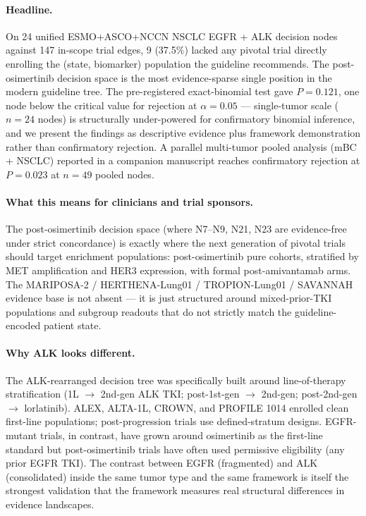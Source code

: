 \documentclass[11pt,a4paper]{article}
\begin{document}
\paragraph{Headline.}
On 24 unified ESMO+ASCO+NCCN NSCLC EGFR + ALK decision nodes against 147 in-scope trial edges, 9 (37.5\%) lacked any pivotal trial directly enrolling the (state, biomarker) population the guideline recommends. The post-osimertinib decision space is the most evidence-sparse single position in the modern guideline tree. The pre-registered exact-binomial test gave $P = 0.121$, one node below the critical value for rejection at $\alpha = 0.05$ — single-tumor scale ($n = 24$ nodes) is structurally under-powered for confirmatory binomial inference, and we present the findings as descriptive evidence plus framework demonstration rather than confirmatory rejection. A parallel multi-tumor pooled analysis (mBC + NSCLC) reported in a companion manuscript reaches confirmatory rejection at $P = 0.023$ at $n = 49$ pooled nodes.

\paragraph{What this means for clinicians and trial sponsors.}
The post-osimertinib decision space (where N7--N9, N21, N23 are evidence-free under strict concordance) is exactly where the next generation of pivotal trials should target enrichment populations: post-osimertinib pure cohorts, stratified by MET amplification and HER3 expression, with formal post-amivantamab arms. The MARIPOSA-2 / HERTHENA-Lung01 / TROPION-Lung01 / SAVANNAH evidence base is not absent --- it is just structured around mixed-prior-TKI populations and subgroup readouts that do not strictly match the guideline-encoded patient state.

\paragraph{Why ALK looks different.}
The ALK-rearranged decision tree was specifically built around line-of-therapy stratification (1L $\to$ 2nd-gen ALK TKI; post-1st-gen $\to$ 2nd-gen; post-2nd-gen $\to$ lorlatinib). ALEX, ALTA-1L, CROWN, and PROFILE 1014 enrolled clean first-line populations; post-progression trials use defined-stratum designs. EGFR-mutant trials, in contrast, have grown around osimertinib as the first-line standard but post-osimertinib trials have often used permissive eligibility (any prior EGFR TKI). The contrast between EGFR (fragmented) and ALK (consolidated) inside the same tumor type and the same framework is itself the strongest validation that the framework measures real structural differences in evidence landscapes.
\end{document}
